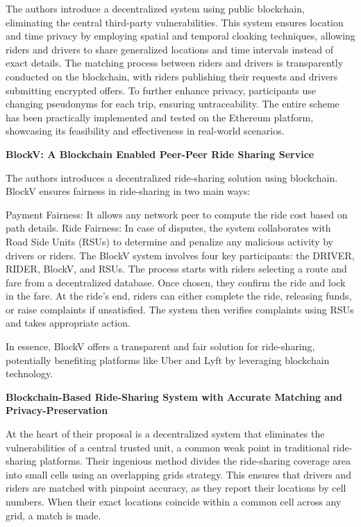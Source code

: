  The authors introduce a decentralized system using public blockchain, eliminating the central third-party vulnerabilities. This system ensures location and time privacy by employing spatial and temporal cloaking techniques, allowing riders and drivers to share generalized locations and time intervals instead of exact details. The matching process between riders and drivers is transparently conducted on the blockchain, with riders publishing their requests and drivers submitting encrypted offers. To further enhance privacy, participants use changing pseudonyms for each trip, ensuring untraceability. The entire scheme has been practically implemented and tested on the Ethereum platform, showcasing its feasibility and effectiveness in real-world scenarios.

\textbf{BlockV: A Blockchain Enabled Peer-Peer Ride Sharing Service}

The authors introduces a decentralized ride-sharing solution using blockchain. BlockV ensures fairness in ride-sharing in two main ways:

Payment Fairness: It allows any network peer to compute the ride cost based on path details.
Ride Fairness: In case of disputes, the system collaborates with Road Side Units (RSUs) to determine and penalize any malicious activity by drivers or riders.
The BlockV system involves four key participants: the DRIVER, RIDER, BlockV, and RSUs. The process starts with riders selecting a route and fare from a decentralized database. Once chosen, they confirm the ride and lock in the fare. At the ride's end, riders can either complete the ride, releasing funds, or raise complaints if unsatisfied. The system then verifies complaints using RSUs and takes appropriate action.

In essence, BlockV offers a transparent and fair solution for ride-sharing, potentially benefiting platforms like Uber and Lyft by leveraging blockchain technology.

\textbf{Blockchain-Based Ride-Sharing System with Accurate Matching and Privacy-Preservation}

At the heart of their proposal is a decentralized system that eliminates the vulnerabilities of a central trusted unit, a common weak point in traditional ride-sharing platforms. Their ingenious method divides the ride-sharing coverage area into small cells using an overlapping grids strategy. This ensures that drivers and riders are matched with pinpoint accuracy, as they report their locations by cell numbers. When their exact locations coincide within a common cell across any grid, a match is made.

